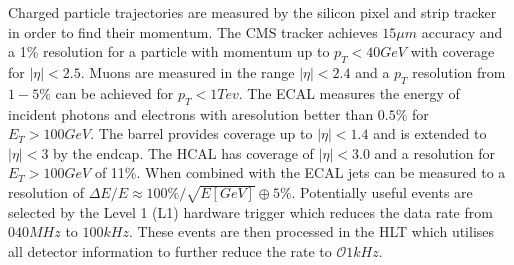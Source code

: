 Charged particle trajectories are measured by the silicon pixel and strip tracker \cite{siliconTDR} in order to find their momentum. The CMS tracker achieves $15\mu m$ accuracy and a 1\% resolution for a particle with momentum up to $p_T < 40GeV$ with coverage for $|\eta|<2.5$. Muons are measured in the range $|\eta|<2.4$ and a $p_T$ resolution from $1-5\%$ can be achieved for $p_T < 1Tev$. The ECAL measures the energy of incident photons and electrons with aresolution better than $0.5\%$ for $E_T > 100 GeV$. The barrel provides coverage up to $|\eta| < 1.4$ and is extended to $|\eta|<3$ by the endcap. The HCAL has coverage of $|\eta|<3.0$ \cite{hcal} and a resolution for $E_T > 100GeV$ of 11\%. When combined with the ECAL jets can be measured to a resolution of $\Delta E/E \approx 100 \%/\sqrt{E[GeV]} \oplus 5\%$.
Potentially useful events are selected by the Level 1 (L1) hardware trigger which reduces the data rate from $\mathcal{0}40MHz$ to $100kHz$. These events are then processed in the HLT which utilises all detector information to further reduce the rate to $\mathcal{O}1kHz$.
